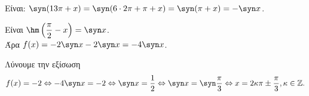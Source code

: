 \begin{alist}
\item Είναι: $\syn (13\pi + x) = \syn (6 \cdot 2\pi + \pi + x) = \syn (\pi + x) = -\syn  x$.
\item Είναι $\hm \left(\dfrac{\pi}{2} - x\right) = \syn  x$. \\
Άρα $f(x) = -2\syn  x - 2\syn  x = -4\syn  x$.
\item Λύνουμε την εξίσωση 
\[f(x) = -2 \Leftrightarrow -4\syn  x = -2 \Leftrightarrow \syn  x = \frac{1}{2} \Leftrightarrow \syn  x = \syn \frac{\pi}{3} \Leftrightarrow x = 2\kappa\pi \pm \frac{\pi}{3}, \kappa \in \mathbb{Z}.\]
\end{alist}

